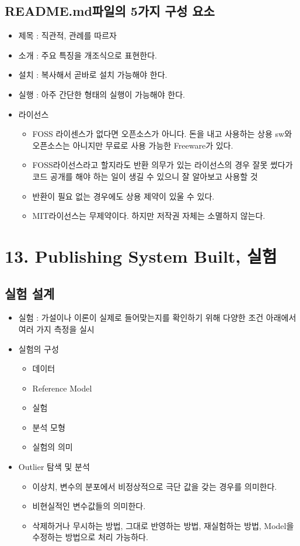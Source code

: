 \documentclass{article}
\begin{document}
\subsection{README.md파일의 5가지 구성 요소}
\begin{itemize}
    \item 제목 : 직관적, 관례를 따르자
    \item 소개 : 주요 특징을 개조식으로 표현한다.
    \item 설치 : 복사해서 곧바로 설치 가능해야 한다.
    \item 실행 : 아주 간단한 형태의 실행이 가능해야 한다.
    \item 라이선스
    \begin{itemize}
        \item FOSS 라이센스가 없다면 오픈소스가 아니다. 돈을 내고 사용하는 상용 sw와 오픈소스는 아니지만 무료로 사용 가능한 Freeware가 있다.
        \item FOSS라이선스라고 할지라도 반환 의무가 있는 라이선스의 경우 잘못 썼다가 코드 공개를 해야 하는 일이 생길 수 있으니 잘 알아보고 사용할 것
        \item 반환이 필요 없는 경우에도 상용 제약이 있울 수 있다.
        \item MIT라이선스는 무제약이다. 하지만 저작권 자체는 소멸하지 않는다.
    \end{itemize}
\end{itemize} 

\section{13. Publishing System Built, 실험}
\subsection{실험 설계}
\begin{itemize}
    \item 실험 : 가설이나 이론이 실제로 들어맞는지를 확인하기 위해 다양한 조건 아래에서 여러 가지 측정을 실시
    \item 실험의 구성
    \begin{itemize}
        \item 데이터
        \item Reference Model
        \item 실험
        \item 분석 모형
        \item 실험의 의미
    \end{itemize}
    \item Outlier 탐색 및 분석
    \begin{itemize}
        \item 이상치, 변수의 분포에서 비정상적으로 극단 값을 갖는 경우를 의미한다.
        \item 비현실적인 변수값들의 의미한다.
        \item 삭제하거나 무시하는 방법, 그대로 반영하는 방법, 재실험하는 방법, Model을 수정하는 방법으로 처리 가능하다.
    \end{itemize}
\end{itemize}
\end{document}
